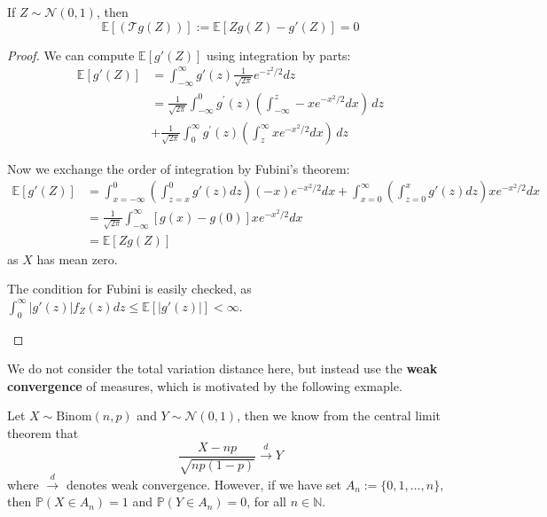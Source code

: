 \documentclass{article}
\begin{document}
\begin{theorem}\label{thm:stein_operator_normal}
    If $Z\sim \mathcal{N}(0, 1)$, then 
    \begin{equation*}
        \mathbb{E}[(\mathcal{T}g(Z))]:=\mathbb{E}[Zg(Z) - g'(Z)] = 0
    \end{equation*}
\end{theorem}

\begin{proof}
    We can compute $\mathbb{E}[g'(Z)]$ using integration by parts:
    \begin{align*}
        \mathbb{E}[g'(Z)] &= \int_{-\infty}^\infty g'(z) \frac{1}{\sqrt{2\pi}} e^{-z^2/2} dz\\
        &= {\frac{1}{\sqrt{2\pi}}}\int_{-\infty}^{0}g^{\prime}(z)\left(\int_{-\infty}^{z}-x e^{-x^{2}/2}d x\right)\,d z \\
        &+ {\frac{1}{\sqrt{2\pi}}}\int_{0}^{\infty}g^{\prime}(z)\left(\int_{z}^{\infty}x e^{-x^{2}/2}d x\right)\,d z
    \end{align*}

    Now we exchange the order of integration by Fubini's theorem:
    \begin{align*}
        \mathbb{E}[g'(Z)] &= \int_{x=-\infty}^0 \left(\int_{z=x}^0 g'(z) dz\right) (-x) e^{-x^2/2} dx + \int_{x=0}^\infty \left(\int_{z=0}^x g'(z) dz\right) xe^{-x^2/2} dx\\
        &={\frac{1}{\sqrt{2\pi}}}\int_{-\infty}^{\infty}[g(x)-g(0)]x e^{-x^{2}/2}d x \\
        &=\mathbb{E}[Z g(Z)]
    \end{align*}
    as $X$ has mean zero.
    \begin{unexaminable}
        The condition for Fubini is easily checked, as $\int_0^\infty |g'(z)| f_Z(z) dz \leq \mathbb{E}[|g'(z)|] < \infty$.
    \end{unexaminable}
\end{proof}

We do not consider the total variation distance here, but instead use the \textbf{weak convergence} of measures, which is motivated by the following exmaple.  

\begin{example}

    Let $X\sim \mathrm{Binom}(n,p)$ and $Y\sim \mathcal{N}(0,1)$, then we know from the central limit theorem that
    \begin{equation*}
        \frac{X-np}{\sqrt{np(1-p)}} \xrightarrow{d} Y
    \end{equation*}
    where $\xrightarrow{d}$ denotes weak convergence. However, if we have set $A_n :=\{0, 1, \ldots, n\}$, then $\mathbb{P}(X\in A_n) = 1$ and $\mathbb{P}(Y\in A_n) = 0$, for all $n\in \mathbb{N}$.
\end{example}
\end{document}
